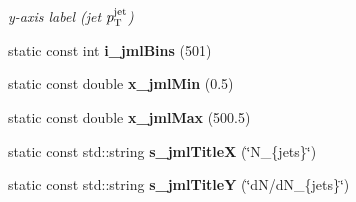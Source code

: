 \begin{CompactItemize}
\begin{CompactList}\small\item\em y-axis label (jet $p_{\rm T}^{\rm jet}$) \item\end{CompactList}\item 
\hypertarget{namespaceHistGroupCfg_1fd13bf0d80b8955ba9390fe207abc98}{
static const int \textbf{i\_\-jml\-Bins} (501)}
\label{namespaceHistGroupCfg_1fd13bf0d80b8955ba9390fe207abc98}

\item 
\hypertarget{namespaceHistGroupCfg_b50011f9fd5f6aaac03175d5f08eb555}{
static const double \textbf{x\_\-jml\-Min} (0.5)}
\label{namespaceHistGroupCfg_b50011f9fd5f6aaac03175d5f08eb555}

\item 
\hypertarget{namespaceHistGroupCfg_b4ff26aecf27f0a90e7b945bcd090e33}{
static const double \textbf{x\_\-jml\-Max} (500.5)}
\label{namespaceHistGroupCfg_b4ff26aecf27f0a90e7b945bcd090e33}

\item 
\hypertarget{namespaceHistGroupCfg_1115f8b586d2ccb081cb5852ed7e404e}{
static const std::string \textbf{s\_\-jml\-Title\-X} (\char`\"{}N\_\-\{jets\}\char`\"{})}
\label{namespaceHistGroupCfg_1115f8b586d2ccb081cb5852ed7e404e}

\item 
\hypertarget{namespaceHistGroupCfg_980f15aba265c7319d2e500972fc81ff}{
static const std::string \textbf{s\_\-jml\-Title\-Y} (\char`\"{}d\-N/d\-N\_\-\{jets\}\char`\"{})}
\label{namespaceHistGroupCfg_980f15aba265c7319d2e500972fc81ff}

\end{CompactItemize}
